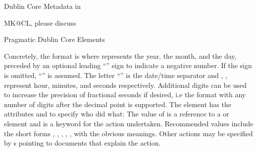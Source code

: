 \begin{module}[id=dc-elements]
\begin{omgroup}[id=dc-elements]{Dublin Core Metadata in {\omdoc}}
\begin{newpart}{MK@CL, please discuss}
\begin{omgroup}{Pragmatic Dublin Core Elements}
\begin{definition}[id=dc.date.def,title=Dates]
  Concretely, the format is
  {}
  where {} represents the year, {} the month, and {}
  the day, preceded by an optional leading ``{\snippet{-}}'' sign to indicate a negative
  number. If the sign is omitted, ``{\snippet{+}}'' is assumed.  The letter
  ``{}'' is the date/time separator and {}, {},
  {} represent hour, minutes, and seconds respectively.  Additional digits can
  be used to increase the precision of fractional seconds if desired, i.e the format
  {} with any number of digits after the decimal
  point is supported.  The {} element has the attributes
  {} and {} to specify
  who did what: The value of {} is a reference to a
  {} or {} element and
  {} is a keyword for the action
  undertaken. Recommended values include the short forms
  {},
  {},
  {},
  {},
  {},
  {} with the obvious meanings. Other actions may
  be specified by {s} pointing to documents that explain the action.
\end{definition}


\end{omgroup}
\end{newpart}
\end{omgroup}
\end{module}
